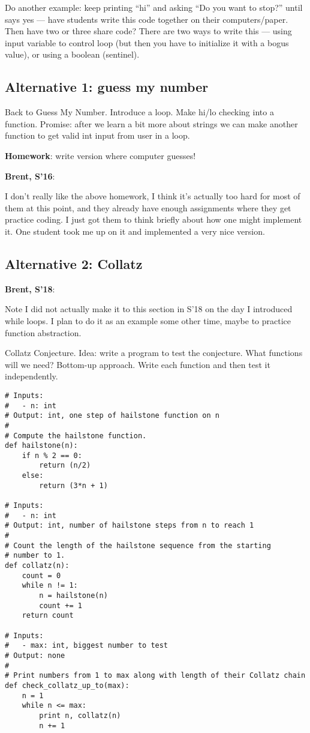 \documentclass{article}
\newenvironment{reflect}[1]
{
  \noindent
  \begin{lrbox}{\reflectbox}
    \begin{minipage}[t]{\textwidth}
      \textbf{#1}:
}{
    \end{minipage}
  \end{lrbox}
  \fbox{\usebox{\reflectbox}}
}
\begin{document}
Do another example: keep printing ``hi'' and asking ``Do you want to
stop?'' until says yes --- have students write this code together on
their computers/paper.  Then have two or three share code?  There are
two ways to write this --- using input variable to control loop (but
then you have to initialize it with a bogus value), or using a boolean
(sentinel).

\subsection*{Alternative 1: guess my number}
Back to Guess My Number.  Introduce a loop.  Make hi/lo checking into
a function.  Promise: after we learn a bit more about strings we can
make another function to get valid int input from user in a loop.

\textbf{Homework}: write version where computer guesses!

\begin{reflect}{Brent, S'16}
  I don't really like the above homework, I think it's actually too
  hard for most of them at this point, and they already have enough
  assignments where they get practice coding.  I just got them to
  think briefly about how one might implement it.  One student took me
  up on it and implemented a very nice version.
\end{reflect}

\subsection*{Alternative 2: Collatz}

\begin{reflect}{Brent, S'18}
  Note I did not actually make it to this section in S'18 on the day I
  introduced while loops.  I plan to do it as an example some other
  time, maybe to practice function abstraction.
\end{reflect}

Collatz Conjecture.  Idea: write a program to test the conjecture.
What functions will we need?  Bottom-up approach.  Write each function
and then test it independently.

\begin{verbatim}
# Inputs:
#   - n: int
# Output: int, one step of hailstone function on n
#
# Compute the hailstone function.
def hailstone(n):
    if n % 2 == 0:
        return (n/2)
    else:
        return (3*n + 1)

# Inputs:
#   - n: int
# Output: int, number of hailstone steps from n to reach 1
#
# Count the length of the hailstone sequence from the starting
# number to 1.
def collatz(n):
    count = 0
    while n != 1:
        n = hailstone(n)
        count += 1
    return count

# Inputs:
#   - max: int, biggest number to test
# Output: none
#
# Print numbers from 1 to max along with length of their Collatz chain
def check_collatz_up_to(max):
    n = 1
    while n <= max:
        print n, collatz(n)
        n += 1
\end{verbatim}
\end{document}
